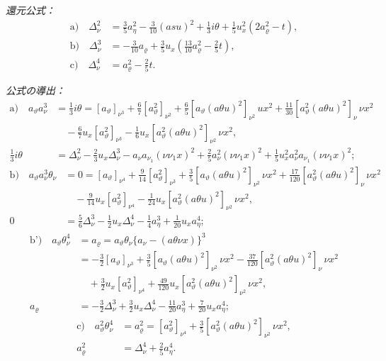 \documentclass[11pt]{jlreq}
\newcommand{\A}{\Delta}
\newcommand{\R}{\varrho}
\begin{document}
\noindent\emph{還元公式：}
\[
\tag{10}
\begin{aligned}
\text{a)}\quad \A_\nu^2
&=\frac35a_\eta^2-\frac3{10}(asu)^2+\frac13 i\theta
+\frac15u_x^2(2a_\R^2-t),\\
\text{b)}\quad \A_\nu^3
&=-\frac3{10}a_\R+\frac35u_x\left(\frac{13}{10}a_\R^2-\frac25t\right),\\
\text{c)}\quad \A_\nu^4&=a_\R^2-\frac25t.
\end{aligned}
\]

\noindent\emph{公式の導出：}
\[
\begin{aligned}
\text{a)}\quad
 a_\vartheta a_\nu^3
&=\frac13 i\theta
=[a_\vartheta]_{\nu^3}+\frac67[a_\vartheta^2]_{\nu^2}
+\frac65[a_\vartheta(a\theta u)^2]_{\nu^2}\, u x^2
+\frac{11}{30}[a_\vartheta^2(a\theta u)^2]_\nu\,\nu x^2\\
&\quad-\frac67u_x[a_\vartheta^2]_{\nu^3}
-\frac16u_x[a_\vartheta^2(a\theta u)^2]_{\nu^2}\,\nu x^2,\\
\frac13 i\theta
&=\A_\nu^2-\frac23u_x\A_\nu^3-a_\nu a_{\nu_1}(\nu\nu_1x)^2
+\frac25a_\nu^2(\nu\nu_1x)^2
+\frac15u_x^2a_\nu^2a_{\nu_1}(\nu\nu_1x)^2;
\end{aligned}
\]
\[
\begin{aligned}
\text{b)}\quad
 a_\vartheta a_\nu^3\theta_\nu
&=0=[a_\vartheta]_{\nu^4}+\frac9{14}[a_\vartheta^2]_{\nu^3}
+\frac35[a_\vartheta(a\theta u)^2]_{\nu^2}\,\nu x^2
+\frac{17}{120}[a_\vartheta^2(a\theta u)^2]_{\nu}\,\nu x^2\\
&\quad-\frac9{14}u_x[a_\vartheta^2]_{\nu^4}
-\frac1{24}u_x[a_\vartheta^2(a\theta u)^2]_{\nu^2}\,\nu x^2,\\
0&=\frac56\A_\nu^3-\frac12u_x\A_\nu^4-\frac14a_\eta^3+\frac1{20}u_xa_\eta^4;
\end{aligned}
\]
\[
\begin{aligned}
\text{b')}\quad
 a_\vartheta\theta_\nu^4
&=a_\R=a_\vartheta\theta_\nu\{a_\nu-(a\theta\nu x)\}^3\\
&=-\frac32[a_\vartheta]_{\nu^3}+\frac35[a_\vartheta(a\theta u)^2]_{\nu^2}\,\nu x^2
-\frac{37}{120}[a_\vartheta^2(a\theta u)^2]_{\nu}\,\nu x^2\\
&\quad+\frac32u_x[a_\vartheta^2]_{\nu^4}
+\frac{49}{120}u_x[a_\vartheta^2(a\theta u)^2]_{\nu^2}\,\nu x^2,\\
a_\R&=-\frac32\A_\nu^3+\frac32u_x\A_\nu^4-\frac{11}{20}a_\eta^3+\frac7{20}u_xa_\eta^4;
\end{aligned}
\]
\[
\begin{aligned}
\text{c)}\quad
 a_\vartheta^2\theta_\nu^4
&=a_\R^2=[a_\vartheta^2]_{\nu^4}+\frac35[a_\vartheta^2(a\theta u)^2]_{\nu^2}\,\nu x^2,\\
a_\R^2&=\A_\nu^4+\frac25a_\eta^4.
\end{aligned}
\]
\end{document}

